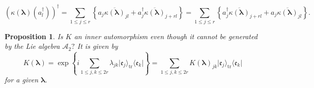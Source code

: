 \documentclass[aps, preprint]{revtex4}
\newtheorem{proposition}[theorem]{Proposition}
\begin{document}
\begin{equation}\left (\kappa  \left (\mathbf{\lambda }\right ) \left (a_{l}^{ \dag }\right )\right )^{ \dag } =\sum _{1 \leq j \leq r}\left \{a_{j} \overline{\kappa  \left (\mathbf{\lambda }\right )}_{j l} +a_{j}^{ \dag } \overline{\kappa  \left (\mathbf{\lambda }\right )}_{j +r l}\right \} =\sum _{1 \leq j \leq r}\left \{a_{j}^{ \dag } \overline{\kappa  \left (\mathbf{\lambda }\right )}_{j +r l} +a_{j} \overline{\kappa  \left (\mathbf{\lambda }\right )}_{j l}\right \}\text{.}
\end{equation}


\begin{proposition}
Is $K$ an inner automorphism even though it cannot be generated by the Lie algebra $\mathcal{A}_{2}\text{?}$ It is given by
\begin{equation}K \left (\mathbf{\lambda }\right ) =\exp  \left \{i \sum _{1 \leq j ,k \leq 2 r}\lambda _{j k} \vert \mathfrak{e}_{j} \rangle _{\ensuremath{\operatorname*{tr}}} \langle \mathfrak{e}_{k}\vert \right \} =\sum _{1 \leq j ,k \leq 2 r}K \left (\mathbf{\lambda }\right )_{j k} \vert \mathfrak{e}_{j} \rangle _{\ensuremath{\operatorname*{tr}}} \langle \mathfrak{e}_{k}\vert 
\end{equation}for a given $\mathbf{\lambda }\text{.}$ 
\end{proposition}
\end{document}
